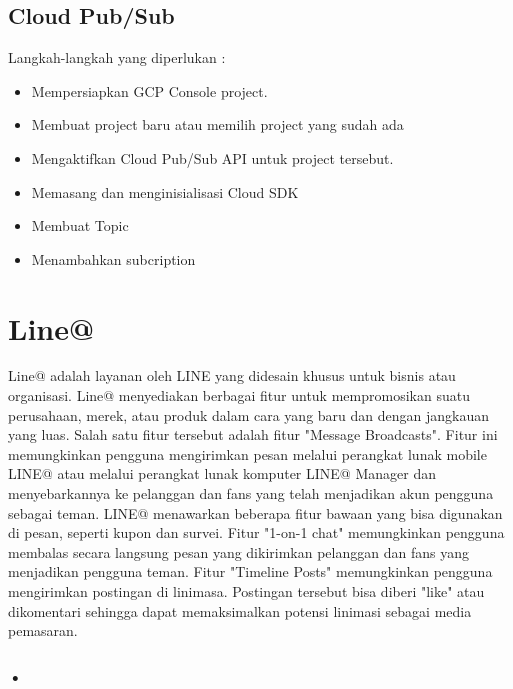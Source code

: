 \subsection{Cloud Pub/Sub}
Langkah-langkah yang diperlukan \footnotemark
{} :
\begin{itemize}
\item Mempersiapkan GCP Console project.
\item Membuat project baru atau memilih project yang sudah ada
\item Mengaktifkan Cloud Pub/Sub API untuk project tersebut.
\item Memasang dan menginisialisasi Cloud SDK
\item Membuat Topic
\item Menambahkan subcription
\end{itemize}

\section{Line@}
\label{sec:Line@}
Line@ adalah layanan oleh LINE yang didesain khusus untuk bisnis atau organisasi. Line@ menyediakan berbagai fitur untuk mempromosikan suatu perusahaan, merek, atau produk dalam cara yang baru dan dengan jangkauan yang luas. Salah satu fitur tersebut adalah fitur "Message Broadcasts". Fitur ini memungkinkan pengguna mengirimkan pesan melalui perangkat lunak mobile LINE@ atau melalui perangkat lunak komputer LINE@ Manager dan menyebarkannya ke pelanggan dan fans yang telah menjadikan akun pengguna sebagai teman. LINE@ menawarkan beberapa fitur bawaan yang bisa digunakan di pesan, seperti kupon dan survei. Fitur "1-on-1 chat" memungkinkan pengguna membalas secara langsung pesan yang dikirimkan pelanggan dan fans yang menjadikan pengguna teman. Fitur "Timeline Posts" memungkinkan pengguna mengirimkan postingan di linimasa. Postingan tersebut bisa diberi "like" atau dikomentari sehingga dapat memaksimalkan potensi linimasi sebagai media pemasaran.\footnotemark
{}
\subsubsection{•}